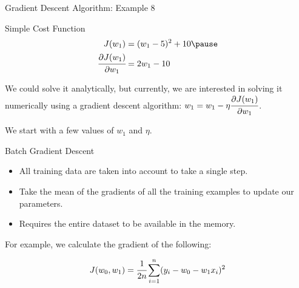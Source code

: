 \documentclass[aspectratio=169,xcolor=dvipsnames,svgnames,x11names,fleqn]{beamer}
\begin{document}
\begin{frame}{Gradient Descent Algorithm: Example 8}

\begin{tblock}{Simple Cost Function}
    \begin{equation}\begin{aligned}
        J(w_1) & = (w_1 - 5)^2 + 10
        \pause\\
        \cfrac{\partial J(w_1)}{\partial w_1} & = 2w_1 - 10
    \end{aligned}
    \end{equation}
    \pause

    We could solve it analytically, but currently, we are interested in solving it numerically using a gradient descent algorithm: $w_1 = w_1 - \eta \cfrac{\partial J(w_1)}{\partial w_1}  $.
    \pause
    
    We start with a few values of $w_1$ and $\eta$.
\end{tblock}
\end{frame}


\begin{frame}{Batch Gradient Descent}

\begin{itemize}
    \item All training data are taken into account to take a single step.
    \item Take the mean of the gradients of all the training examples to update our parameters.
    \item Requires the entire dataset to be available in the memory.
\end{itemize}
For example, we calculate the gradient of the following:

\begin{equation}
    J(w_0, w_1) = \cfrac{1}{2n}\sum_{i=1}^n ( y_i -  w_0 - w_1 x_i )^2
\end{equation}
\end{frame}
\end{document}
